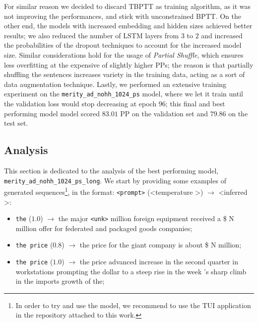 For similar reason we decided to discard TBPTT as training algorithm, as it was not improving the performances, and stick with unconstrained BPTT. On the other end, the models with increased embedding and hidden sizes achieved better results; we also reduced the number of LSTM layers from $3$ to $2$ and increased the probabilities of the dropout techniques to account for the increased model size. Similar considerations hold for the usage of \emph{Partial Shuffle}, which ensures less overfitting at the expensive of slightly higher PPs; the reason is that partially shuffling the sentences increases variety in the training data, acting as a sort of data augmentation technique. Lastly, we performed an extensive training experiment on the \texttt{merity\_ad\_nohh\_1024\_ps} model, where we let it train until the validation loss would stop decreasing at epoch $96$; this final and best performing model model scored $83.01$ PP on the validation set and $79.86$ on the test set.

\subsection{Analysis}
This section is dedicated to the analysis of the best performing model, \texttt{merity\_ad\_nohh\_1024\_ps\_long}. We start by providing some examples of generated sequences\footnote{In order to try and use the model, we recommend to use the  TUI application in the repository attached to this work.}, in the format: \texttt{<prompt>} (\textless temperature \textgreater) $\rightarrow$ \textless inferred \textgreater:
\begin{itemize}
    \item \texttt{the} ($1.0$) $\rightarrow$ the major \texttt{<unk>} million foreign equipment received a \$ N million offer for federated and packaged goods companies;
    \item \texttt{the price} ($0.8$) $\rightarrow$ the price for the giant company is about \$ N million;
    \item \texttt{the price} ($1.0$) $\rightarrow$ the price advanced increase in the second quarter in workstations prompting the dollar to a steep rise in the week 's sharp climb in the imports growth of the;
\end{itemize}

